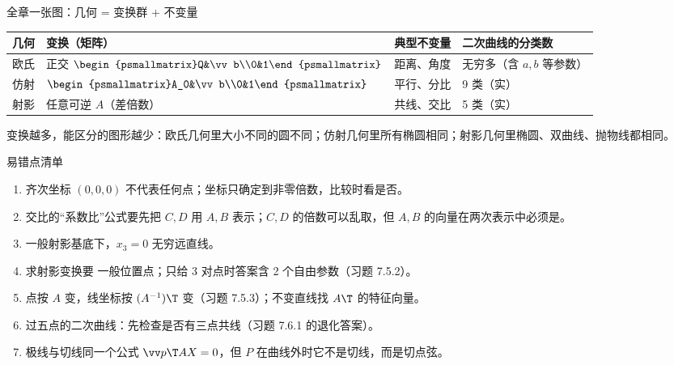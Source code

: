 \begin{intbox}{全章一张图：几何 = 变换群 + 不变量}
\begin{center}
\renewcommand{\arraystretch}{1.25}
\begin{tabular}{@{}llll@{}}
\toprule
几何 & 变换（矩阵） & 典型不变量 & 二次曲线的分类数\\\midrule
欧氏 & 正交 $\begin{psmallmatrix}Q&\vv b\\0&1\end{psmallmatrix}$ & 距离、角度 & 无穷多（含 $a,b$ 等参数）\\
仿射 & $\begin{psmallmatrix}A_0&\vv b\\0&1\end{psmallmatrix}$ & 平行、分比 & 9 类（实）\\
射影 & 任意可逆 $A$（差倍数） & 共线、交比 & 5 类（实）\\\bottomrule
\end{tabular}
\end{center}
变换越多，能区分的图形越少：欧氏几何里大小不同的圆不同；仿射几何里所有椭圆相同；射影几何里椭圆、双曲线、抛物线都相同。
\end{intbox}

\begin{ckbox}{易错点清单}
\begin{enumerate}
\item 齐次坐标 $(0,0,0)$ 不代表任何点；坐标只确定到非零倍数，比较时看是否。
\item 交比的“系数比”公式要先把 $C,D$ 用 $A,B$ 表示；$C,D$ 的倍数可以乱取，但 $A,B$ 的向量在两次表示中必须是。
\item 一般射影基底下，$x_3=0$ 无穷远直线。
\item 求射影变换要 一般位置点；只给 3 对点时答案含 2 个自由参数（习题 7.5.2）。
\item 点按 $A$ 变，线坐标按 $(A^{-1})\T$ 变（习题 7.5.3）；不变直线找 $A\T$ 的特征向量。
\item 过五点的二次曲线：先检查是否有三点共线（习题 7.6.1 的退化答案）。
\item 极线与切线同一个公式 $\vv p\T AX=0$，但 $P$ 在曲线外时它不是切线，而是切点弦。
\end{enumerate}
\end{ckbox}
